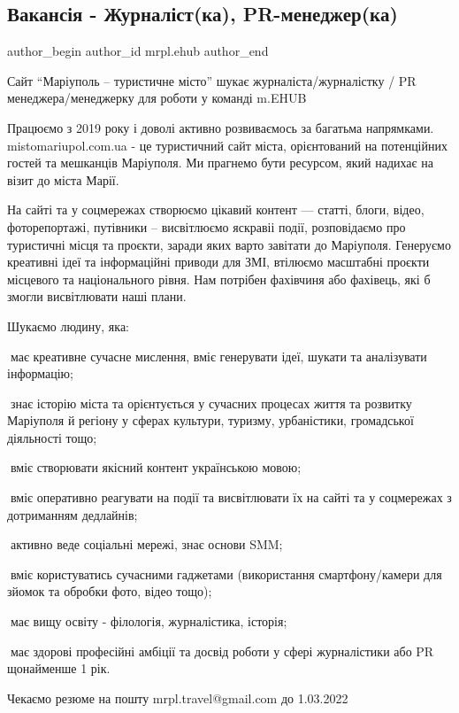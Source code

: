  
 
 
 
 

\subsection{Вакансія - Журналіст(ка), PR-менеджер(ка)}
\label{sec:21_02_2022.fb.mrpl.ehub.1.vakansia_zhurnalist_pr_manager}

\ifcmt
 author_begin
   author_id mrpl.ehub
 author_end
\fi

Сайт \enquote{Маріуполь – туристичне місто} шукає журналіста/журналістку /  PR
менеджера/менеджерку для роботи у команді m.EHUB

Працюємо з 2019 року і доволі активно розвиваємось за багатьма напрямками.
mistomariupol.com.ua - це туристичний сайт міста, орієнтований на потенційних
гостей та мешканців Маріуполя. Ми прагнемо бути ресурсом,  який надихає на
візит до міста Марії.  

На сайті та у соцмережах створюємо цікавий контент — статті, блоги, відео,
фоторепортажі, путівники –  висвітлюємо яскравіі події, розповідаємо про
туристичні місця та проєкти, заради яких варто завітати до Маріуполя. Генеруємо
креативні ідеї та інформаційні приводи для ЗМІ, втілюємо масштабні проєкти
місцевого та національного рівня. Нам потрібен фахівчиня або фахівець, які б
змогли висвітлювати наші плани. 

Шукаємо людину, яка:

📍має креативне сучасне мислення, вміє генерувати ідеї,  шукати та аналізувати
інформацію;

📍знає історію міста та орієнтується у сучасних процесах життя та розвитку
Маріуполя й регіону у сферах культури, туризму, урбаністики, громадської
діяльності тощо;

📍вміє створювати якісний контент українською мовою; 

📍вміє оперативно реагувати на події та висвітлювати їх на сайті та у
соцмережах з дотриманням дедлайнів;

📍активно веде соціальні мережі, знає основи SMM;

📍вміє користуватись сучасними гаджетами (використання смартфону/камери для
зйомок та обробки фото, відео тощо);

📍має вищу освіту - філологія, журналістика, історія; 

📍має здорові професійні амбіції та досвід роботи у сфері журналістики або PR
щонайменше 1 рік.

Чекаємо резюме на пошту mrpl.travel@gmail.com до 1.03.2022
